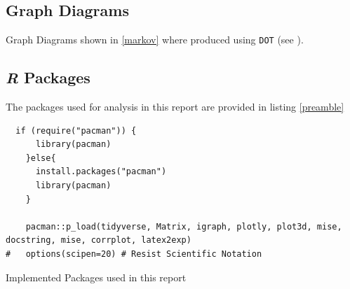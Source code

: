\documentclass[11pt, twoside]{report}
\begin{document}
\subsection{Graph Diagrams}
\label{sec:orgc4aeb84}
Graph Diagrams shown in \ref{markov} where produced using \texttt{DOT} (see \cite{DOTLanguage,DOTGraphDescription2020}).


\subsection{\textit{\textbf{R}} Packages}
\label{sec:orgc4aeb84}

The packages used for analysis in this report are provided in listing \ref{preamble}
\begin{listing}[htbp]
\begin{tcolorbox}
\begin{verbatim}
  if (require("pacman")) {
      library(pacman)
    }else{
      install.packages("pacman")
      library(pacman)
    }

    pacman::p_load(tidyverse, Matrix, igraph, plotly, plot3d, mise, docstring, mise, corrplot, latex2exp)
#   options(scipen=20) # Resist Scientific Notation
\end{verbatim}
\caption{\label{preamble}Implemented Packages used in this report}
\end{tcolorbox}
\end{listing}
\end{document}
